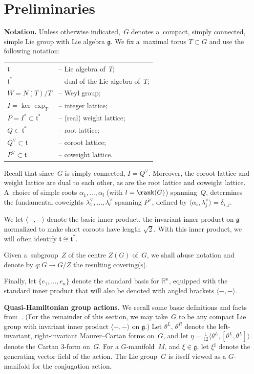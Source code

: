 \section{Preliminaries}

{\bf Notation.}
Unless otherwise indicated,~$G$ denotes a~compact, simply connected, simple Lie group with Lie algebra $\mathfrak{g}$.
We f\/ix a~maximal torus $T\subset G$ and use the following notation:

\begin{tabular}{l@{\,\,}l} $\mathfrak{t}$ & -- Lie algebra of~$T$;
\\
$\mathfrak{t}^*$ & -- dual of the Lie algebra of~$T$;
\\
$W=N(T)/T$ & -- Weyl group;
\\
$I= \ker \exp_T$ & -- integer lattice;
\\
$P =I^*\subset \mathfrak{t}^*$ & -- (real) weight lattice;
\\
$Q \subset \mathfrak{t}^*$ & -- root lattice;
\\
$Q^\vee\subset \mathfrak{t}$ & -- coroot lattice;
\\
$P^\vee \subset \mathfrak{t}$ & -- coweight lattice.
\end{tabular}

Recall that since~$G$ is simply connected, $I=Q^\vee$.
Moreover, the coroot lattice and weight lattice are dual to each other, as are the root lattice and coweight lattice.
A~choice of simple roots $\alpha_1, \ldots, \alpha_l$ (with $l=\rank(G)$) spanning~$Q$, determines the fundamental
coweights $\lambda_1^\vee, \ldots, \lambda_l^\vee$ spanning $P^\vee$, def\/ined by $\langle\alpha_i,\lambda_j^\vee
\rangle=\delta_{i,j}$.

We let $\langle-,-\rangle$ denote the basic inner product, the invariant inner product on $\mathfrak{g}$ normalized to
make short coroots have length $\sqrt{2}$.
With this inner product, we will often identify $\mathfrak{t} \cong \mathfrak{t}^*$.

Given a~subgroup~$Z$ of the centre $Z(G)$ of~$G$, we shall abuse notation and denote by $q:G\to G/Z$ the resulting
covering(s).

Finally, let $\{e_1, \ldots, e_n\}$ denote the standard basis for ${\mathbb{R}}^n$, equipped with the standard inner
product that will also be denoted with angled brackets $\langle -, - \rangle$.

{\bf Quasi-Hamiltonian group actions.}
We recall some basic def\/initions and facts from~\cite{AMM}.
(For the remainder of this section, we may take~$G$ to be any compact Lie group with invariant inner product
$\langle-,-\rangle$ on $\mathfrak{g}$.) Let $\theta^L$, $\theta^R$ denote the left-invariant, right-invariant
Maurer--Cartan forms on~$G$, and let $\eta= \tfrac{1}{12} \langle \theta^L, [\theta^L,\theta^L] \rangle $ denote the
Cartan 3-form on~$G$.
For a $G$-manifold~$M$, and $\xi \in \mathfrak{g}$, let $\xi^\sharp$ denote the generating vector f\/ield of the action.
The Lie group~$G$ is itself viewed as a $G$-manifold for the conjugation action.

